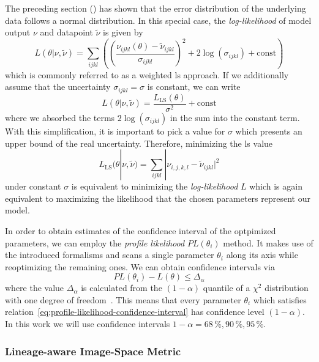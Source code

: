 \documentclass[10pt,letterpaper]{article}
\begin{document}
The preceding section () has shown that
the error distribution of the underlying data follows a normal distribution.
In this special case, the \textit{log-likelihood} of model output $\nu$ and datapoint $\tilde{\nu}$
is given by
\begin{equation}
    L(\theta|\nu,\tilde{\nu}) = \sum\limits_{ijkl}\left(\left(\frac{\nu_{ijkl}(\theta)-\tilde{\nu}_{ijkl}}{\sigma_{ijkl}}\right)^2
    + 2 \log(\sigma_{ijkl})
    +\text{const}\right)
\end{equation}
which is commonly referred to as a weighted \ac{ls} approach.
If we additionally assume that the uncertainty $\sigma_{ijkl}=\sigma$ is constant, we can write
\begin{equation}
    L(\theta|\nu,\tilde{\nu}) = \frac{L_\text{LS}(\theta)}{\sigma^2} + \text{const}
\end{equation}
where we absorbed the terms $2\log(\sigma_{ijkl})$ in the sum into the constant term.
With this simplification, it is important to pick a value for $\sigma$ which presents an upper bound
of the real uncertainty.
Therefore, minimizing the \ac{ls} value
\begin{equation}
    L_{\text{LS}}(\theta|\nu,\tilde{\nu})
        = \sum\limits_{ijkl}|\nu_{i,j,k,l} - \tilde{\nu}_{ijkl}|^2
\end{equation}
under constant $\sigma$ is equivalent to minimizing the \textit{log-likelihood} $L$ which is again
equivalent to maximizing the likelihood that the chosen parameters represent our model.

In order to obtain estimates of the confidence interval of the optpimized parameters, we can employ
the \textit{profile likelihood} $PL(\theta_i)$ method.
It makes use of the introduced formalisms and scans a single parameter $\theta_i$ along its axis
while reoptimizing the remaining ones.
We can obtain confidence intervals via
\begin{equation}
    PL(\theta_i) - L(\theta) \leq \Delta_\alpha
    \label{eq:profile-likelihood-confidence-interval}
\end{equation}
where the value $\Delta_\alpha$ is calculated from the $(1-\alpha)$ quantile of a $\chi^2$
distribution with one degree of freedom~\cite{Tnsing2023}.
This means that every parameter $\theta_i$ which satisfies
relation~\eqref{eq:profile-likelihood-confidence-interval} has confidence level $(1-\alpha)$.
In this work we will use confidence intervals $1-\alpha=68\,\%, 90\,\%, 95\,\%$.

\subsubsection{Lineage-aware Image-Space Metric}
\label{subsec:image-space-metric}
\end{document}
